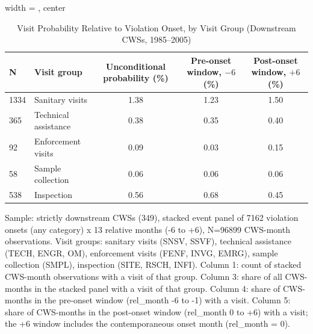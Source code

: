 \begin{table}[htbp]
\caption{\label{tab:sanitary_visit_onset_summary} Visit Probability Relative to Violation Onset, by Visit Group (Downstream CWSs, 1985--2005)}
\bigskip
\centering
\begin{adjustbox}{width = \textwidth, center}
\begin{tabular}{llccc}
\toprule
N & Visit group & Unconditional probability (\%) & Pre-onset window, $-6$ (\%) & Post-onset window, $+6$ (\%) \\
\midrule
1334 & Sanitary visits & 1.38 & 1.23 & 1.50 \\
365 & Technical assistance & 0.38 & 0.35 & 0.40 \\
92 & Enforcement visits & 0.09 & 0.03 & 0.15 \\
58 & Sample collection & 0.06 & 0.06 & 0.06 \\
538 & Inspection & 0.56 & 0.68 & 0.45 \\
\bottomrule
\end{tabular}
\end{adjustbox}
{\tiny\linespread{1}\selectfont \par \raggedright 
Sample: strictly downstream CWSs (349), stacked event panel of 7162 violation onsets (any category) x 13 relative months (-6 to +6), N=96899 CWS-month observations. Visit groups: sanitary visits (SNSV, SSVF), technical assistance (TECH, ENGR, OM), enforcement visits (FENF, INVG, EMRG), sample collection (SMPL), inspection (SITE, RSCH, INFI). Column 1: count of stacked CWS-month observations with a visit of that group. Column 3: share of all CWS-months in the stacked panel with a visit of that group. Column 4: share of CWS-months in the pre-onset window (rel\_month -6 to -1) with a visit. Column 5: share of CWS-months in the post-onset window (rel\_month 0 to +6) with a visit; the +6 window includes the contemporaneous onset month (rel\_month = 0).
}
\end{table}
